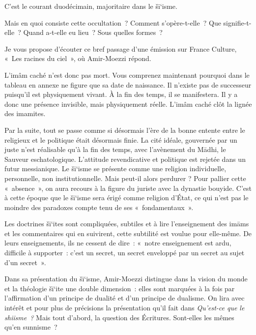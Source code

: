 C'est le courant duodécimain, majoritaire dans le šī`isme.

Mais en quoi consiste cette occultation~? Comment s'opère-t-elle~? Que
signifie-t-elle~? Quand a-t-elle eu lieu~? Sous quelles formes~?

Je vous propose d'écouter ce bref passage d'une émission sur France
Culture, «~Les racines du ciel~», où Amir-Moezzi répond.

L'imâm caché n'est donc pas mort. Vous comprenez maintenant pourquoi
dans le tableau en annexe ne figure que sa date de naissance. Il
n'existe pas de successeur puisqu'il est physiquement vivant. À la fin
des temps, il se manifestera. Il y a donc une présence invisible, mais
physiquement réelle. L'imâm caché clôt la lignée des imamites.

Par la suite, tout se passe comme si désormais l'ère de la bonne entente
entre le religieux et le politique était désormais finie. La cité
idéale, gouvernée par un juste n'est réalisable qu'à la fin des temps,
avec l'avènement du Mādhi, le Sauveur eschatologique. L'attitude
revendicative et politique est rejetée dans un futur messianique. Le
šī`isme se présente comme une religion individuelle, personnelle, non
institutionnelle. Mais peut-il alors perdurer ? Pour pallier cette
«~absence~», on aura recours à la figure du juriste avec la dynastie
bouyide. C'est à cette époque que le šī`isme sera érigé comme religion
d'État, ce qui n'est pas le moindre des paradoxes compte tenu de ses
«~fondamentaux~».


Les doctrines šī`ites sont compliquées, subtiles et à lire
l'enseignement des imāms et les commentaires qui en suivirent, cette
subtilité est voulue pour elle-même. De leurs enseignements, ils ne
cessent de dire~: «~notre enseignement est ardu, difficile à supporter~:
c'est un secret, un secret enveloppé par un secret au sujet d'un
secret~».

Dans sa présentation du šī`isme, Amir-Moezzi distingue dans la vision du
monde et la théologie šī`ite une double dimension~: elles sont marquées
à la fois par l'affirmation d'un principe de dualité et d'un principe de
dualisme. On lira avec intérêt et pour plus de précisions la
présentation qu'il fait dans \emph{Qu'est-ce que le shiisme~?} Mais tout
d'abord, la question des Écritures. Sont-elles les mêmes qu'en
sunnisme~?

